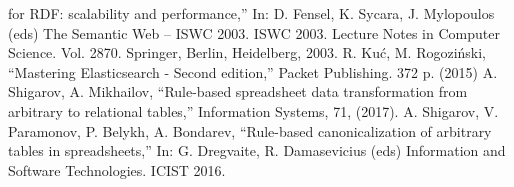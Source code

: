 \documentclass[conference,a4paper]{IEEEtran}
\begin{document}
\begin{thebibliography}{99}
  for RDF: scalability and performance,'' In: D. Fensel, K. Sycara,
  J. Mylopoulos (eds) The Semantic Web -- ISWC 2003. ISWC 2003. Lecture
  Notes in Computer Science. Vol. 2870. Springer, Berlin,
  Heidelberg, 2003.
  R. Kuć, M. Rogoziński, ``Mastering Elasticsearch - Second edition,'' Packet
  Publishing. 372 p. (2015)
A. Shigarov, A. Mikhailov, ``Rule-based spreadsheet data transformation from arbitrary to relational tables,'' Information Systems, 71, (2017). 
A. Shigarov, V. Paramonov, P. Belykh, A. Bondarev, ``Rule-based canonicalization of arbitrary tables in spreadsheets,'' In: G. Dregvaite, R. Damasevicius (eds) Information and Software Technologies. ICIST 2016.
\end{thebibliography}
\end{document}
